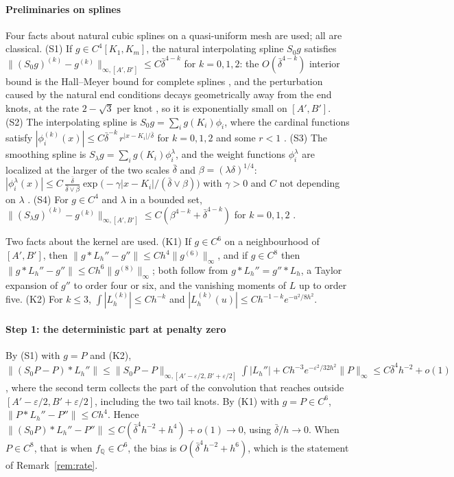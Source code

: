 \documentclass[preprint,12pt,authoryear,times]{elsarticle}
\newcommand{\Q}{\mathbb{Q}}
\begin{document}
\paragraph{Preliminaries on splines}
Four facts about natural cubic splines on a quasi-uniform mesh are used; all are classical. (S1) If \(g\in C^4[K_1,K_m]\), the natural interpolating spline \(S_0g\) satisfies \(\|(S_0g)^{(k)}-g^{(k)}\|_{\infty,[A',B']}\le C\bar\delta^{4-k}\) for \(k=0,1,2\): the \(O(\bar\delta^{4-k})\) interior bound is the Hall--Meyer bound for complete splines \citep{hallmeyer1976}, and the perturbation caused by the natural end conditions decays geometrically away from the end knots, at the rate \(2-\sqrt3\) per knot \citep[Ch.~IV]{deboor2001}, so it is exponentially small on \([A',B']\). (S2) The interpolating spline is \(S_0g=\sum_i g(K_i)\phi_i\), where the cardinal functions satisfy \(|\phi_i^{(k)}(x)|\le C\bar\delta^{-k}\,r^{|x-K_i|/\bar\delta}\) for \(k=0,1,2\) and some \(r<1\) \citep{demko1977}. (S3) The smoothing spline is \(S_\lambda g=\sum_i g(K_i)\phi_i^\lambda\), and the weight functions \(\phi_i^\lambda\) are localized at the larger of the two scales \(\bar\delta\) and \(\beta=(\lambda\delta)^{1/4}\): \(|\phi_i^\lambda(x)|\le C\,\frac{\bar\delta}{\bar\delta\vee\beta}\exp\bigl(-\gamma|x-K_i|/(\bar\delta\vee\beta)\bigr)\) with \(\gamma>0\) and \(C\) not depending on \(\lambda\) \citep{silverman1984,messer1993}. (S4) For \(g\in C^4\) and \(\lambda\) in a bounded set, \(\|(S_\lambda g)^{(k)}-g^{(k)}\|_{\infty,[A',B']}\le C(\beta^{4-k}+\bar\delta^{4-k})\) for \(k=0,1,2\) \citep{ragozin1983}.

Two facts about the kernel are used. (K1) If \(g\in C^6\) on a neighbourhood of \([A',B']\), then \(\|g\ast L_h''-g''\|\le Ch^4\|g^{(6)}\|_\infty\), and if \(g\in C^8\) then \(\|g\ast L_h''-g''\|\le Ch^6\|g^{(8)}\|_\infty\); both follow from \(g\ast L_h''=g''\ast L_h\), a Taylor expansion of \(g''\) to order four or six, and the vanishing moments of \(L\) up to order five. (K2) For \(k\le 3\), \(\int|L^{(k)}_h|\le Ch^{-k}\) and \(|L^{(k)}_h(u)|\le Ch^{-1-k}e^{-u^2/8h^2}\).

\paragraph{Step 1: the deterministic part at penalty zero}
By (S1) with \(g=P\) and (K2), \(\|(S_0P-P)\ast L_h''\|\le\|S_0P-P\|_{\infty,[A'-\varepsilon/2,B'+\varepsilon/2]}\int|L_h''|+Ch^{-3}e^{-\varepsilon^2/32h^2}\|P\|_\infty\le C\bar\delta^4h^{-2}+o(1)\), where the second term collects the part of the convolution that reaches outside \([A'-\varepsilon/2,B'+\varepsilon/2]\), including the two tail knots. By (K1) with \(g=P\in C^6\), \(\|P\ast L_h''-P''\|\le Ch^4\). Hence \(\|(S_0P)\ast L_h''-P''\|\le C(\bar\delta^4h^{-2}+h^4)+o(1)\to 0\), using \(\bar\delta/h\to 0\). When \(P\in C^8\), that is when \(f_{\Q}\in C^6\), the bias is \(O(\bar\delta^4h^{-2}+h^6)\), which is the statement of Remark~\ref{rem:rate}.
\end{document}
